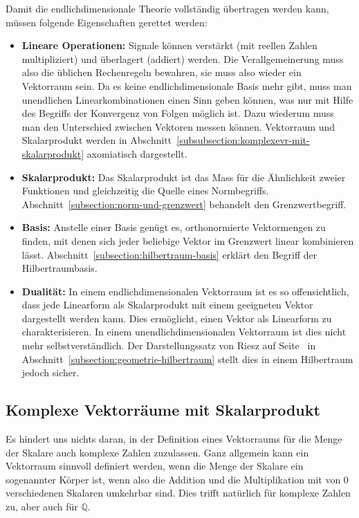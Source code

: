 Damit die endlichdimensionale Theorie vollständig übertragen werden kann,
müssen folgende Eigenschaften gerettet werden:
\begin{itemize}
\item {\bf Lineare Operationen:}
Signale können verstärkt (mit reellen Zahlen multipliziert) und überlagert
(addiert) werden.
Die Verallgemeinerung muss also die üblichen Rechenregeln bewahren,
sie muss also wieder ein Vektorraum sein.
Da es keine endlichdimensionale Basis mehr gibt, muss man unendlichen
Linearkombinationen einen Sinn geben können, was nur mit Hilfe des
Begriffs der Konvergenz von Folgen möglich ist.
Dazu wiederum muss man den Unterschied zwischen Vektoren messen können.
Vektorraum und Skalarprodukt werden in
Abschnitt~\ref{subsubsection:komplexevr-mit-skalarprodukt}
axomiatisch dargestellt.
\item {\bf Skalarprodukt:}
Das Skalarprodukt ist das Mass für die Ähnlichkeit zweier Funktionen
und gleichzeitig die Quelle eines Normbegriffs.
Abschnitt~\ref{subsection:norm-und-grenzwert} behandelt den Grenzwertbegriff.
\item {\bf Basis:}
Anstelle einer Basis genügt es, orthonormierte Vektormengen zu finden,
mit denen sich jeder beliebige Vektor im Grenzwert linear kombinieren
lässt.
Abschnitt~\ref{subsection:hilbertraum-basis} erklärt den Begriff der
Hilbertraumbasis.
\item {\bf Dualität:}
In einem endlichdimensionalen Vektorraum ist es so offensichtlich, dass
jede Linearform als Skalarprodukt mit einem geeigneten Vektor 
dargestellt werden kann.
Dies ermöglicht, einen Vektor als Linearform zu charakterisieren.
In einem unendlichdimensionalen Vektorraum ist dies nicht mehr
selbstverständlich.
Der Darstellungssatz von Riesz auf Seite~\pageref{subsubsection:riesz}
in Abschnitt~\ref{subsection:geometrie-hilbertraum}
stellt dies in einem Hilbertraum jedoch sicher.
\end{itemize}

\subsection{Komplexe Vektorräume mit Skalarprodukt
\label{subsubsection:komplexevr-mit-skalarprodukt}}
Es hindert uns nichts daran, in der Definition eines Vektorraums für die
Menge der Skalare auch komplexe Zahlen zuzulassen.
Ganz allgemein kann ein Vektorraum sinnvoll definiert werden, wenn die Menge
der Skalare ein sogenannter Körper ist, wenn also die Addition
und die Multiplikation mit von $0$ verschiedenen Skalaren umkehrbar sind.
Dies trifft natürlich für komplexe Zahlen zu, aber auch für $\mathbb Q$.

